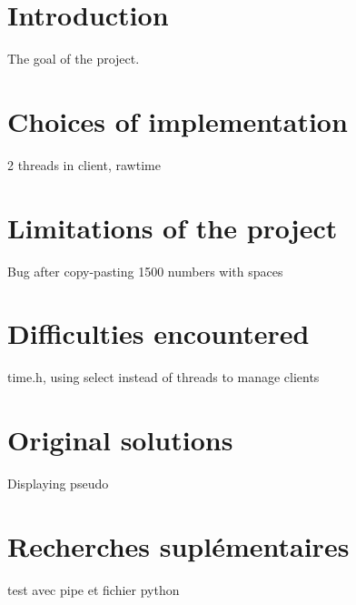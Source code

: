 \documentclass[utf8]{article}
\begin{document}
\tableofcontents
\newpage

\section{Introduction}

The goal of the project.

\section{Choices of implementation}

2 threads in client, rawtime

\section{Limitations of the project}

Bug after copy-pasting 1500 numbers with spaces

\section{Difficulties encountered}

time.h, using select instead of threads to manage clients

\section{Original solutions}

Displaying pseudo

\section{Recherches suplémentaires}

test avec pipe et fichier python
\end{document}
